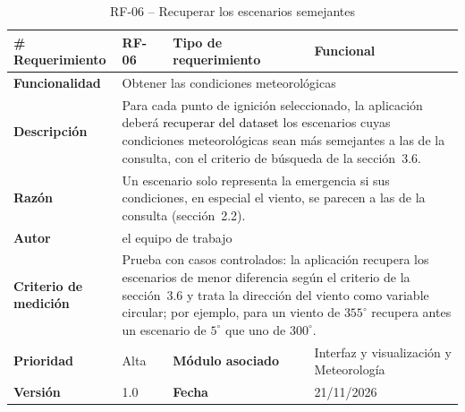 \begin{longtable}{|p{\rqA}|p{\rqB}|p{\rqC}|p{\rqD}|}
  \caption{RF-06 -- Recuperar los escenarios semejantes}\label{tab:rf-06}\tabularnewline
  \hline
  \textbf{\# Requerimiento} & RF-06 & \raggedright\textbf{Tipo de requerimiento} & Funcional\tabularnewline\hline
  \raggedright\textbf{Funcionalidad} & \multicolumn{3}{p{\rqBCD}|}{Obtener las condiciones meteorológicas}\tabularnewline\hline
  \endfirsthead
  \textbf{Descripción} & \multicolumn{3}{p{\rqBCD}|}{Para cada punto de ignición seleccionado, la aplicación deberá \textcolor{black}{recuperar del dataset} los escenarios cuyas condiciones meteorológicas sean más semejantes a las de la consulta, con el criterio de búsqueda de la sección~3.6.}\tabularnewline\hline
  \textbf{Razón} & \multicolumn{3}{p{\rqBCD}|}{Un escenario solo representa la emergencia si sus condiciones, en especial el viento, se parecen a las de la consulta (sección~2.2).}\tabularnewline\hline
  \textbf{Autor} & \multicolumn{3}{p{\rqBCD}|}{el equipo de trabajo}\tabularnewline\hline
  \raggedright\textbf{Criterio de medición} & \multicolumn{3}{p{\rqBCD}|}{Prueba con casos controlados: la aplicación recupera los escenarios de menor diferencia según el criterio de la sección~3.6 y trata la dirección del viento como variable circular; por ejemplo, para un viento de $355^{\circ}$ recupera antes un escenario de $5^{\circ}$ que uno de $300^{\circ}$.}\tabularnewline\hline
  \textbf{Prioridad} & Alta & \raggedright\textbf{Módulo asociado} & Interfaz y visualización y Meteorología\tabularnewline\hline
  \textbf{Versión} & 1.0 & \textbf{Fecha} & 21/11/2026\tabularnewline\hline
\end{longtable}

